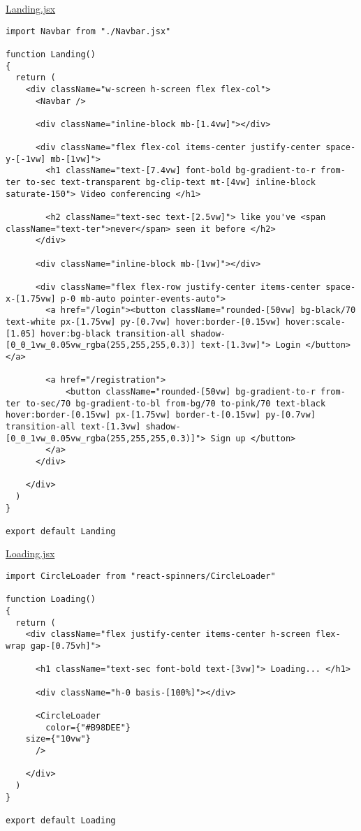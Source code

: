 \underline{Landing.jsx}

\begin{verbatim}
import Navbar from "./Navbar.jsx"

function Landing()
{
  return (
    <div className="w-screen h-screen flex flex-col">
      <Navbar />

      <div className="inline-block mb-[1.4vw]"></div>

      <div className="flex flex-col items-center justify-center space-y-[-1vw] mb-[1vw]">
        <h1 className="text-[7.4vw] font-bold bg-gradient-to-r from-ter to-sec text-transparent bg-clip-text mt-[4vw] inline-block saturate-150"> Video conferencing </h1>

        <h2 className="text-sec text-[2.5vw]"> like you've <span className="text-ter">never</span> seen it before </h2>
      </div>

      <div className="inline-block mb-[1vw]"></div>

      <div className="flex flex-row justify-center items-center space-x-[1.75vw] p-0 mb-auto pointer-events-auto">
        <a href="/login"><button className="rounded-[50vw] bg-black/70 text-white px-[1.75vw] py-[0.7vw] hover:border-[0.15vw] hover:scale-[1.05] hover:bg-black transition-all shadow-[0_0_1vw_0.05vw_rgba(255,255,255,0.3)] text-[1.3vw]"> Login </button></a>

        <a href="/registration">
	        <button className="rounded-[50vw] bg-gradient-to-r from-ter to-sec/70 bg-gradient-to-bl from-bg/70 to-pink/70 text-black hover:border-[0.15vw] px-[1.75vw] border-t-[0.15vw] py-[0.7vw] transition-all text-[1.3vw] shadow-[0_0_1vw_0.05vw_rgba(255,255,255,0.3)]"> Sign up </button>
        </a>
      </div>

    </div>
  )
}

export default Landing
\end{verbatim}

\underline{Loading.jsx}

\begin{verbatim}
import CircleLoader from "react-spinners/CircleLoader"

function Loading()
{
  return (
    <div className="flex justify-center items-center h-screen flex-wrap gap-[0.75vh]">

      <h1 className="text-sec font-bold text-[3vw]"> Loading... </h1>

      <div className="h-0 basis-[100%]"></div>

      <CircleLoader
        color={"#B98DEE"}
	size={"10vw"}
      />

    </div>
  )
}

export default Loading
\end{verbatim}

